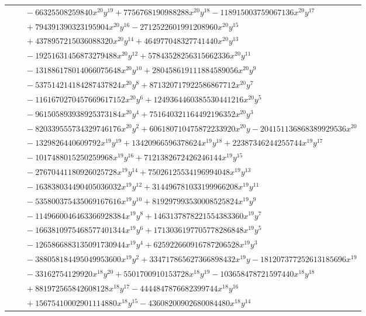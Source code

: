 \documentclass[11pt]{article}
\begin{document}
\begin{longtable}{@{}ll@{}}
 & $\quad -66325508259840x^{20}y^{19}+7756768190988288x^{20}y^{18}-118915003759067136x^{20}y^{17}$\\
 & $\quad +794391390323195904x^{20}y^{16}-2712522601991208960x^{20}y^{15}$\\
 & $\quad +4378957215036088320x^{20}y^{14}+464977048327741440x^{20}y^{13}$\\
 & $\quad -19251631456873279488x^{20}y^{12}+57843528256315662336x^{20}y^{11}$\\
 & $\quad -131886178014066075648x^{20}y^{10}+280458619111884589056x^{20}y^{9}$\\
 & $\quad -537514214184287437824x^{20}y^{8}+871320717922586867712x^{20}y^{7}$\\
 & $\quad -1161670270457669617152x^{20}y^{6}+1249364460385530441216x^{20}y^{5}$\\
 & $\quad -961505893938925373184x^{20}y^{4}+751640321164492196352x^{20}y^{3}$\\
 & $\quad -820339555734329746176x^{20}y^{2}+606180710475872233920x^{20}y-204151136868389929536x^{20}$\\
 & $\quad -1329826440609792x^{19}y^{19}+13420966596378624x^{19}y^{18}+22387346244255744x^{19}y^{17}$\\
 & $\quad -1017488015250259968x^{19}y^{16}+7121382672426246144x^{19}y^{15}$\\
 & $\quad -27670441180926025728x^{19}y^{14}+75026125534196994048x^{19}y^{13}$\\
 & $\quad -163838034490405036032x^{19}y^{12}+314496781033199966208x^{19}y^{11}$\\
 & $\quad -535800375435069167616x^{19}y^{10}+819297993530008525824x^{19}y^{9}$\\
 & $\quad -1149660046463366928384x^{19}y^{8}+1463137878221554383360x^{19}y^{7}$\\
 & $\quad -1663810975468577401344x^{19}y^{6}+1713036197705778286848x^{19}y^{5}$\\
 & $\quad -1265866883135091730944x^{19}y^{4}+625922660916787206528x^{19}y^{3}$\\
 & $\quad -388058184495049953600x^{19}y^{2}+334717865627366898432x^{19}y-181207377252613185696x^{19}$\\
 & $\quad -33162754129920x^{18}y^{20}+5501700910153728x^{18}y^{19}-103658478721597440x^{18}y^{18}$\\
 & $\quad +881972565842608128x^{18}y^{17}-4444847876682399744x^{18}y^{16}$\\
 & $\quad +15675410002901114880x^{18}y^{15}-43608200902680084480x^{18}y^{14}$\\

\end{longtable}
\end{document}
